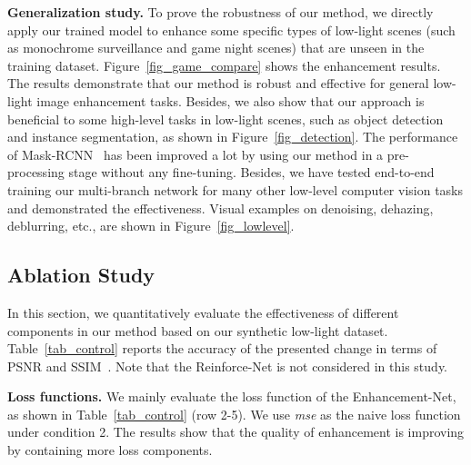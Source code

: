 {\bf Generalization study.} To prove the robustness of our method, we directly apply our trained model to enhance some specific types of low-light scenes (such as monochrome surveillance and game night scenes) that are unseen in the training dataset. Figure~\ref{fig_game_compare} shows the enhancement results. The results demonstrate that our method is robust and effective for general low-light image enhancement tasks. Besides, we also show that our approach is beneficial to some high-level tasks in low-light scenes, such as object detection and instance segmentation, as shown in Figure~\ref{fig_detection}. The performance of Mask-RCNN~\cite{matterport_maskrcnn_2017,He2017MaskR} has been improved a lot by using our method in a pre-processing stage without any fine-tuning.
Besides, we have tested end-to-end training our multi-branch network for many other low-level computer vision tasks and demonstrated the effectiveness. Visual examples on denoising, dehazing, deblurring, etc., are shown in Figure~\ref{fig_lowlevel}.


\subsection{Ablation Study}
In this section, we quantitatively evaluate the effectiveness of different components in our method based on our synthetic low-light dataset. Table~\ref{tab_control} reports the accuracy of the presented change in terms of PSNR and SSIM~\cite{wang2004image}. Note that the Reinforce-Net is not considered in this study.

{\bf Loss functions.} We mainly evaluate the loss function of the Enhancement-Net, as shown in Table~\ref{tab_control} (row 2-5). We use \textit{mse} as the naive loss function under condition 2. The results show that the quality of enhancement is improving by containing more loss components.

